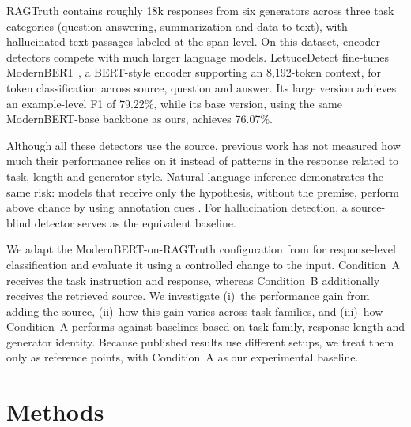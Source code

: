 \documentclass[conference]{IEEEtran}
\begin{document}
RAGTruth \cite{niu2024ragtruth} contains roughly 18k responses from six generators
across three task categories (question answering, summarization and data-to-text),
with hallucinated text passages labeled at the span level. On this dataset,
encoder detectors compete with much larger language models. LettuceDetect
\cite{kovacs2025lettucedetect} fine-tunes ModernBERT
\cite{warner2024modernbert}, a BERT-style encoder \cite{devlin2019bert}
supporting an 8{,}192-token context, for token classification across source,
question and answer. Its large version achieves an example-level F1 of 79.22\%,
while its base version, using the same ModernBERT-base backbone as ours,
achieves 76.07\%.

Although all these detectors use the source, previous work has not measured how
much their performance relies on it instead of patterns in the response related
to task, length and generator style. Natural language inference demonstrates the
same risk: models that receive only the hypothesis, without the premise, perform
above chance by using annotation cues
\cite{gururangan2018annotation,poliak2018hypothesis}. For hallucination detection,
a source-blind detector serves as the equivalent baseline.

We adapt the ModernBERT-on-RAGTruth configuration from
\cite{kovacs2025lettucedetect} for response-level classification and evaluate it
using a controlled change to the input. Condition~A receives the task
instruction and response, whereas Condition~B additionally receives the
retrieved source. We investigate (i)~the performance
gain from adding the source, (ii)~how this gain varies across task families, and
(iii)~how Condition~A performs against baselines based on task family, response
length and generator identity. Because published results use different setups,
we treat them only as reference points, with Condition~A as our experimental
baseline.

\section{Methods}
\end{document}
